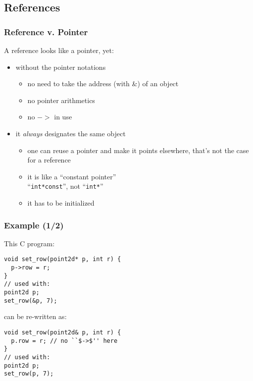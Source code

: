 \documentclass{beamer}
\newcommand{\code}[1]{{\scriptsize{\texttt{#1}}}\xspace}
\begin{document}
\subsection{References}


\begin{frame}
  \frametitle{Reference v. Pointer}

  A reference looks like a pointer, yet:
  \begin{itemize}
  \item without the pointer notations
    \begin{itemize}
    \item no need to take the address (with \&) of an object
    \item no pointer arithmetics
    \item no $->$ in use
    \end{itemize}
  \item it \emph{always} designates the same object
    \begin{itemize}
    \item one can reuse a pointer and make it points elsewhere, that's
      not the case for a reference
    \item it is like a ``constant pointer''\\
      ``\code{int*const}'', not ``\code{int*}''
    \item it has to be initialized
    \end{itemize}
  \end{itemize}

\end{frame}


\begin{frame}[fragile]
  \frametitle{Example (1/2)}

This C program:

\begin{lstlisting}
void set_row(point2d* p, int r) {
  p->row = r;
}
// used with:
point2d p;
set_row(&p, 7);
\end{lstlisting}

\smallskip

can be re-written as:
\begin{lstlisting}
void set_row(point2d& p, int r) {
  p.row = r; // no ``$->$'' here
}
// used with:
point2d p;
set_row(p, 7);
\end{lstlisting}

\end{frame}
\end{document}
